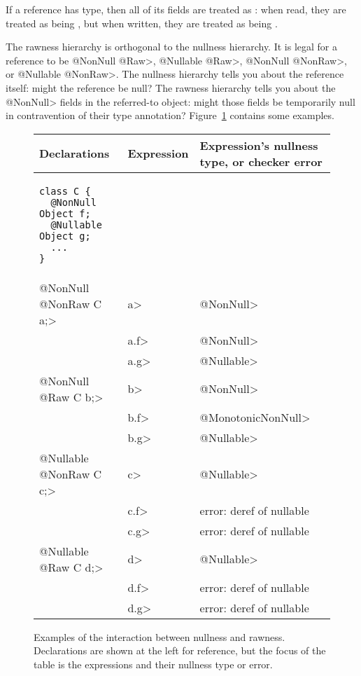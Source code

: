 If a reference has
 type, then all of its  fields are treated as
:  when read, they are
treated as being , but when
written, they are treated as being
.


The rawness hierarchy is orthogonal to the nullness hierarchy.  It
is legal for a reference to be \<@NonNull @Raw>, \<@Nullable @Raw>,
\<@NonNull @NonRaw>, or \<@Nullable @NonRaw>.  The nullness hierarchy tells
you about the reference itself:  might the reference be null?  The rawness
hierarchy tells you about the \<@NonNull> fields in the referred-to object:
might those fields be temporarily null in contravention of their
type annotation?
Figure~\ref{fig:rawness-examples} contains some examples.

\begin{figure}
\begin{tabular}{l|l|l}
Declarations & Expression & Expression's nullness type, or checker error \\ \hline
\begin{minipage}{1.5in}
\begin{Verbatim}
class C {
  @NonNull Object f;
  @Nullable Object g;
  ...
}
\end{Verbatim}
\end{minipage} & & \\ \cline{2-3}
\<@NonNull @NonRaw C a;>
& \<a> & \<@NonNull> \\
& \<a.f> & \<@NonNull> \\
& \<a.g> & \<@Nullable> \\ \cline{2-3}
\<@NonNull @Raw C b;>
& \<b> & \<@NonNull> \\
& \<b.f> & \<@MonotonicNonNull> \\
& \<b.g> & \<@Nullable> \\ \cline{2-3}
\<@Nullable @NonRaw C c;>
& \<c> & \<@Nullable> \\
& \<c.f> & error: deref of nullable \\
& \<c.g> & error: deref of nullable \\ \cline{2-3}
\<@Nullable @Raw C d;>
& \<d> & \<@Nullable> \\
& \<d.f> & error: deref of nullable \\
& \<d.g> & error: deref of nullable \\
\end{tabular}
\caption{Examples of the interaction between nullness and rawness.
  Declarations are shown at the left for reference, but the focus of the
  table is the expressions and their nullness type or error.}
\label{fig:rawness-examples}
\end{figure}


